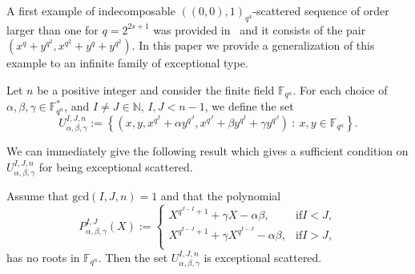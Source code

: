 A first example of indecomposable $((0,0),1)_{q^4}$-scattered sequence of order larger than one for $q=2^{2s+1}$ was provided in~\cite{BMN2022} and it consists of the pair $(x^q+y^{q^2},x^{q^2}+y^q+y^{q^2})$. 
In this paper we provide a generalization of this example to an infinite family of exceptional type.

\begin{defi}
\label{defn:sets}
Let $n$ be a positive integer and consider the finite field $\mathbb{F}_{q^n}$. For each choice of $\alpha,\beta,\gamma \in \mathbb{F}_{q^n}^*$, and $I\neq J\in \mathbb{N}$, $I,J<n-1$,  we define the set
\begin{equation*}
        U_{\alpha, \beta, \gamma}^{I,J,n}:=\left\{\left(x,y,x^{q^I}+\alpha y^{q^J},x^{q^J}+\beta y^{q^I} + \gamma y^{q^J}\right) \ : \ x,y\in \mathbb{F}_{q^n}\right\}.
\end{equation*}
\end{defi}

We can immediately give the following result which gives a sufficient condition on $U_{\alpha, \beta, \gamma}^{I,J,n}$ for being exceptional scattered.

\begin{theorem}
\label{thm:scattered:1}
Assume that $\mathrm{gcd}(I,J,n)=1$ and that the polynomial 
\begin{equation}\label{Eq:P}
    P^{I,J}_{\alpha,\beta,\gamma}(X):=\begin{cases}
    X^{q^{J-I}+1} + \gamma X - \alpha\beta,& \mathrm{if } I<J,\\ 
     X^{q^{I-J}+1} + \gamma X^{q^{I-J}} - \alpha\beta,& \mathrm{if } I>J,\\
    \end{cases}
\end{equation}
has no roots in $\mathbb{F}_{q^n}$. Then the set $U_{\alpha, \beta, \gamma}^{I,J,n}$ is exceptional scattered.
\end{theorem}




